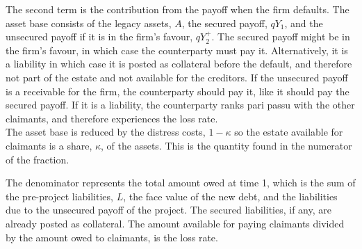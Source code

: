 \documentclass[../main.tex]{subfiles}
\begin{document}
        The second term is the contribution from the payoff when the firm defaults. 
        The asset base consists of the legacy assets, $A$, the secured payoff, $qY_{1}$, 
        and the unsecured payoff if it is in the firm's favour, $qY_{2}^{+}$.
        The secured payoff might be in the firm's favour, in which case the counterparty must pay it. 
        Alternatively, it is a liability in which case it is posted as collateral before the default,
        and therefore not part of the estate and not available for the creditors.
        If the unsecured payoff is a receivable for the firm, 
        the counterparty should pay it, like it should pay the secured payoff.
        If it is a liability, the counterparty ranks pari passu with the other claimants,
        and therefore experiences the loss rate.
        \\
        The asset base is reduced by the distress costs, $1-\kappa$ so the estate available for claimants
        is a share, $\kappa$, of the assets. 
        This is the quantity found in the numerator of the fraction.
        
        The denominator represents the total amount owed at time 1, 
        which is the sum of the pre-project liabilities, $L$, the face value of the new debt, 
        and the liabilities due to the unsecured payoff of the project.
        The secured liabilities, if any, are already posted as collateral.
        The amount available for paying claimants divided by the amount owed to claimants, is the loss rate.
\end{document}

